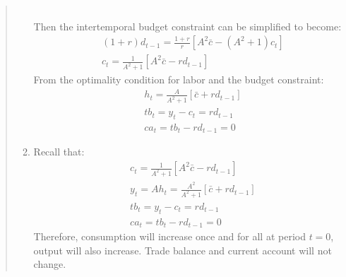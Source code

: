 \begin{exercise}
\begin{quote}
\begin{enumerate}
\\Then the intertemporal budget constraint can be simplified to become:
\begin{align*}
&(1+r)d_{t-1} = \frac{1+r}{r} [A^2 \bar{c}-(A^2 +1)c_t] \\
& c_t = \frac{1}{A^2 + 1}[A^2 \bar{c} - rd_{t-1}]
\end{align*}
From the optimality condition for labor and the budget constraint:
\begin{align*}
& h_t = \frac{A}{A^2 + 1}[\bar{c} + r d_{t-1}] \\
& tb_t = y_t - c_t = r d_{t-1} \\
& ca_t = tb_t - r d_{t-1} = 0
\end{align*}

\item 

 Recall that:
\begin{align*}
& c_t = \frac{1}{A^2 + 1}[A^2 \bar{c} - rd_{t-1}]\\
& y_t = Ah_t = \frac{A^2}{A^2 + 1}[\bar{c} + r d_{t-1}] \\
& tb_t = y_t - c_t = r d_{t-1} \\
& ca_t = tb_t - r d_{t-1} = 0
\end{align*}
Therefore, consumption will increase once and for all at period $t=0$, output will also increase. Trade balance and current account will not change.

\end{enumerate}
\end{quote}
\end{exercise}

